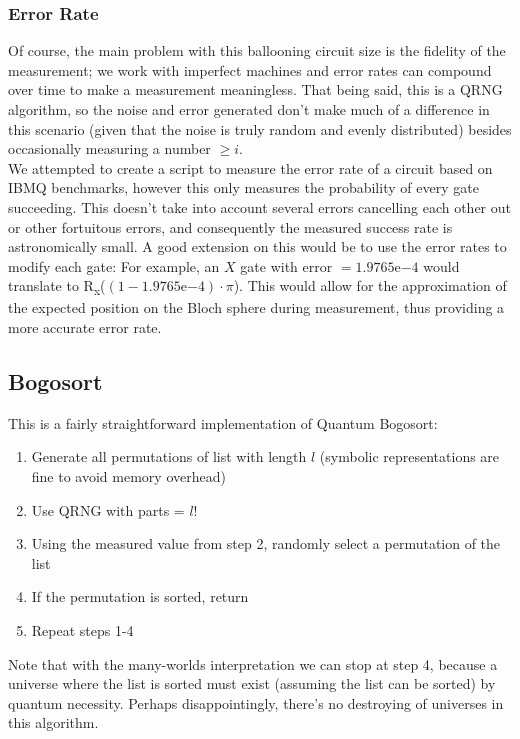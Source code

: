 \documentclass[12pt]{article}
\begin{document}
\subsubsection{Error Rate}
Of course, the main problem with this ballooning circuit size is the fidelity of the measurement; we work with imperfect machines and error rates can compound over time to make a measurement meaningless. 
That being said, this is a QRNG algorithm, so the noise and error generated don't make much of a difference in this scenario (given that the noise is truly random and evenly distributed) besides occasionally measuring a number $ \geq i$. \\
We attempted to create a script to measure the error rate of a circuit based on IBMQ benchmarks, however this only measures the probability of every gate succeeding. This doesn't take into account several errors cancelling each other out or other fortuitous errors, and consequently the measured success rate is astronomically small. A good extension on this would be to use the error rates to modify each gate: For example, an $X$ gate with error $= 1.9765\mathrm{e}{-4}$ would translate to R\textsubscript{x}($(1-1.9765\mathrm{e}{-4}) \cdot \pi$). This would allow for the approximation of the expected position on the Bloch sphere during measurement, thus providing a more accurate error rate.

\subsection{Bogosort}
This is a fairly straightforward implementation of Quantum Bogosort:
\begin{enumerate}
    \item Generate all permutations of list with length $l$ (symbolic representations are fine to avoid memory overhead)
    \item Use QRNG with parts = $l!$
    \item Using the measured value from step 2, randomly select a permutation of the list
    \item If the permutation is sorted, return
    \item Repeat steps 1-4
\end{enumerate}
\vspace{15mm}
Note that with the many-worlds interpretation we can stop at step 4, because a universe where the list is sorted must exist (assuming the list can be sorted) by quantum necessity. Perhaps disappointingly, there's no destroying of universes in this algorithm.
\end{document}
